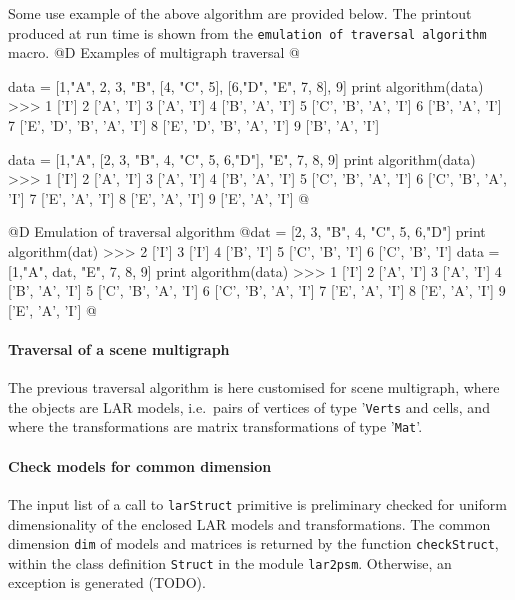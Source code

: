 \documentclass[11pt,oneside]{article}	%
\begin{document}
Some use example of the above algorithm are provided below. The printout produced at run time is shown from the \texttt{emulation of traversal algorithm} macro.
@D Examples of multigraph traversal
@{data = [1,"A", 2, 3, "B", [4, "C", 5], [6,"D", "E", 7, 8], 9]  
print algorithm(data)
>>> 1 ['I']
	2 ['A', 'I']
	3 ['A', 'I']
	4 ['B', 'A', 'I']
	5 ['C', 'B', 'A', 'I']
	6 ['B', 'A', 'I']
	7 ['E', 'D', 'B', 'A', 'I']
	8 ['E', 'D', 'B', 'A', 'I']
	9 ['B', 'A', 'I']

data = [1,"A", [2, 3, "B", 4, "C", 5, 6,"D"], "E", 7, 8, 9]  
print algorithm(data)
>>> 1 ['I']
	2 ['A', 'I']
	3 ['A', 'I']
	4 ['B', 'A', 'I']
	5 ['C', 'B', 'A', 'I']
	6 ['C', 'B', 'A', 'I']
	7 ['E', 'A', 'I']
	8 ['E', 'A', 'I']
	9 ['E', 'A', 'I']
@}
@D Emulation of traversal algorithm
@{dat = [2, 3, "B", 4, "C", 5, 6,"D"]
print algorithm(dat)
>>> 2 ['I']
	3 ['I']
	4 ['B', 'I']
	5 ['C', 'B', 'I']
	6 ['C', 'B', 'I']
data = [1,"A", dat, "E", 7, 8, 9]
print algorithm(data)
>>> 1 ['I']
	2 ['A', 'I']
	3 ['A', 'I']
	4 ['B', 'A', 'I']
	5 ['C', 'B', 'A', 'I']
	6 ['C', 'B', 'A', 'I']
	7 ['E', 'A', 'I']
	8 ['E', 'A', 'I']
	9 ['E', 'A', 'I']
@}

\paragraph{Traversal of a scene multigraph}

The previous traversal algorithm is here customised for scene multigraph, where the objects are LAR models, i.e.~pairs of vertices of type '\texttt{Verts} and cells, and where the transformations are matrix transformations of type '\texttt{Mat}'.

\paragraph{Check models for common dimension}
The input list of a call to \texttt{larStruct} primitive is preliminary checked for uniform dimensionality of the enclosed LAR models and transformations. The common dimension \texttt{dim} of models and matrices is returned by the function \texttt{checkStruct}, within the class definition \texttt{Struct} in the module \texttt{lar2psm}. Otherwise, an exception is generated (TODO).
\end{document}
